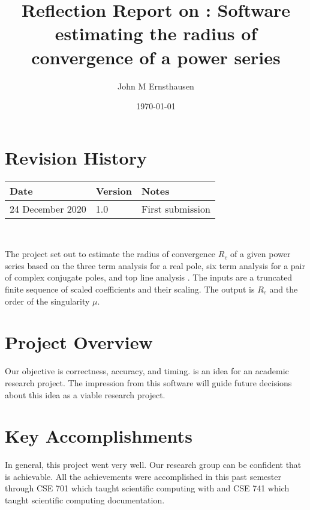 \documentclass[12pt, titlepage]{article}
\begin{document}
\title{Reflection Report on :
Software estimating the radius of convergence of a power series} 
\author{John M Ernsthausen}
\date{\today}
	
\maketitle


\section{Revision History}

\begin{tabularx}{\textwidth}{p{4cm}p{2cm}X}
\toprule {\bf Date} & {\bf Version} & {\bf Notes}\\
\midrule
24 December 2020 & 1.0 & First submission\\
\bottomrule
\end{tabularx}

~~\newpage


The  project set out to estimate the radius of convergence $R_c$ of a given
power series based on the three term analysis for a real pole, six term analysis for
a pair of complex conjugate poles, and top line analysis \cite[pp.~127--128]{chang1982}.
The inputs are a truncated finite sequence of scaled coefficients
and their scaling. The output is $R_c$ and the order of the singularity $\mu$.

\section{Project Overview}

Our objective is correctness, accuracy, and timing.  is an idea for an academic
research project. The impression from this software will guide future decisions about
this idea as a viable research project.

\section{Key Accomplishments}

In general, this project went very well. Our research group can be confident that 
is achievable. All the achievements were accomplished in this past semester through
CSE 701 which taught scientific computing with \cpp and CSE 741 which taught scientific
computing documentation.
\end{document}
